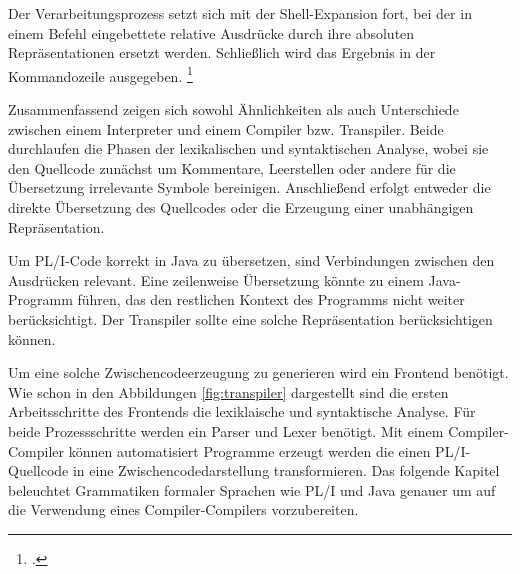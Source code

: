 Der Verarbeitungsprozess setzt sich mit der Shell-Expansion fort, bei der in einem Befehl eingebettete relative Ausdrücke durch ihre absoluten Repräsentationen ersetzt werden.
Schließlich wird das Ergebnis in der Kommandozeile ausgegeben. \footcite[Vgl. ][]{gnubash}


Zusammenfassend zeigen sich sowohl Ähnlichkeiten als auch Unterschiede zwischen einem Interpreter und einem Compiler bzw. Transpiler. Beide durchlaufen die Phasen der lexikalischen und syntaktischen Analyse, wobei sie den Quellcode zunächst um Kommentare, Leerstellen oder andere für die Übersetzung irrelevante Symbole bereinigen. Anschließend erfolgt entweder die direkte Übersetzung des Quellcodes oder die Erzeugung einer unabhängigen Repräsentation.

Um PL/I-Code korrekt in Java zu übersetzen, sind Verbindungen zwischen den Ausdrücken relevant. Eine zeilenweise Übersetzung könnte zu einem Java-Programm führen, das den restlichen Kontext des Programms nicht weiter berücksichtigt. Der Transpiler sollte eine solche Repräsentation berücksichtigen können.

Um eine solche Zwischencodeerzeugung zu generieren wird ein Frontend benötigt. Wie schon in den Abbildungen \ref{fig:transpiler} dargestellt sind die ersten Arbeitsschritte des Frontends die lexiklaische und syntaktische Analyse. Für beide Prozessschritte werden ein Parser und Lexer benötigt. Mit einem Compiler-Compiler können automatisiert Programme erzeugt werden die einen PL/I-Quellcode in eine Zwischencodedarstellung transformieren.
Das folgende Kapitel beleuchtet Grammatiken formaler Sprachen wie PL/I und Java genauer um auf die Verwendung eines Compiler-Compilers vorzubereiten.




\pagebreak
   
